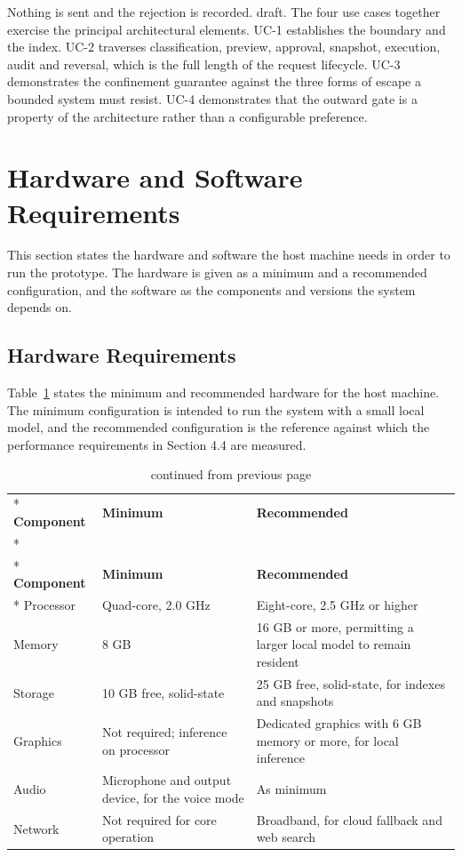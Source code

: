 \documentclass{FastFyp}
\begin{document}
Nothing is sent and the rejection is recorded. draft. The four use cases together exercise the principal architectural elements. UC-1 establishes the boundary and the index. UC-2 traverses classification, preview, approval, snapshot, execution, audit and reversal, which is the full length of the request lifecycle. UC-3 demonstrates the confinement guarantee against the three forms of escape a bounded system must resist. UC-4 demonstrates that the outward gate is a property of the architecture rather than a configurable preference.

\section{Hardware and Software Requirements}
This section states the hardware and software the host machine needs in order to run the prototype. The hardware is given as a minimum and a recommended configuration, and the software as the components and versions the system depends on.

\subsection{Hardware Requirements}
Table~\ref{tab:hardware} states the minimum and recommended hardware for the host machine. The minimum configuration is intended to run the system with a small local model, and the recommended configuration is the reference against which the performance requirements in Section 4.4 are measured.

{
\begin{longtable}{|p{3.4cm}|p{4.8cm}|p{5.4cm}|}
\caption{Host hardware requirements.}\label{tab:hardware}\\*
\hline
\textbf{Component} & \textbf{Minimum} & \textbf{Recommended} \\*
\hline
\endfirsthead
\caption[]{continued from previous page}\\*
\hline
\textbf{Component} & \textbf{Minimum} & \textbf{Recommended} \\*
\hline
\endhead
\hline
Processor & Quad-core, 2.0 GHz & Eight-core, 2.5 GHz or higher \\
\hline
Memory & 8 GB & 16 GB or more, permitting a larger local model to remain resident \\
\hline
Storage & 10 GB free, solid-state & 25 GB free, solid-state, for indexes and snapshots \\
\hline
Graphics & Not required; inference on processor & Dedicated graphics with 6 GB memory or more, for local inference \\
\hline
Audio & Microphone and output device, for the voice mode & As minimum \\
\hline
Network & Not required for core operation & Broadband, for cloud fallback and web search \\
\hline
\end{longtable}
}
\end{document}

